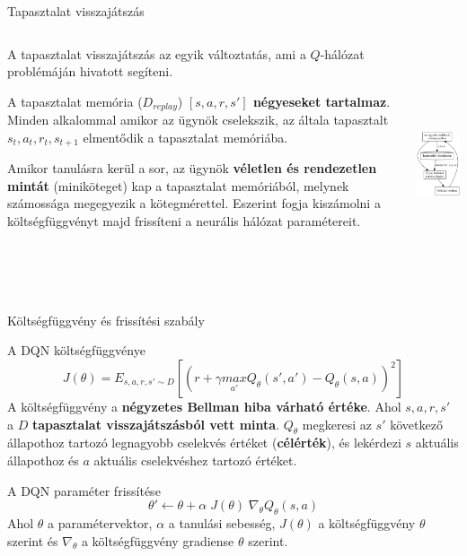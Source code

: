 \documentclass[english, aspectratio=169]{beamer}
\begin{document}
\begin{frame}{Tapasztalat visszajátszás}
\begin{columns}
\begin{column}{.65\textwidth}
A tapasztalat visszajátszás az egyik változtatás, ami a $Q$-hálózat problémáján hivatott segíteni.\par\smallskip
A tapasztalat memória ($D_{replay}$) \textbf{$[s,a,r,s']$ négyeseket tartalmaz}. Minden alkalommal amikor az ügynök cselekszik, az általa tapasztalt $s_t, a_t, r_t, s_{t+1}$ elmentődik a tapasztalat memóriába.\par\smallskip
Amikor tanulásra kerül a sor, az ügynök \textbf{véletlen és rendezetlen mintát} (miniköteget) kap a tapasztalat memóriából, melynek számossága megegyezik a kötegmérettel. Eszerint fogja kiszámolni a költségfüggvényt majd frissíteni a neurális hálózat paramétereit.
\end{column}
\begin{column}{.35\textwidth}
\begin{center}
\includegraphics[height=7cm, keepaspectratio]{graphs/ql_4.png}
\end{center}
\end{column}
\end{columns}
\end{frame}

\begin{frame}{Költségfüggvény és frissítési szabály}
\begin{block}{A DQN költségfüggvénye}
\[
J(\theta) = E_{s,a,r,s' \sim D} \left[ \left( r + \gamma \underset{a'}{max} Q_\theta(s',a') - Q_\theta(s,a) \right)^2 \right]
\]
A költségfüggvény a \textbf{négyzetes Bellman hiba várható értéke}. Ahol $s,a,r,s'$ a $D$ \textbf{tapasztalat visszajátszásból vett minta}. $Q_\theta$ megkeresi az $s'$ következő állapothoz tartozó legnagyobb cselekvés értéket (\textbf{célérték}), és lekérdezi $s$ aktuális állapothoz és $a$ aktuális cselekvéshez tartozó értéket. 
\end{block}
\begin{block}{A DQN paraméter frissítése}
\[
\theta' \leftarrow \theta + \alpha \; J(\theta) \; \nabla_\theta Q_\theta(s,a)
\]
Ahol $\theta$ a paramétervektor, $\alpha$ a tanulási sebesség, $J(\theta)$ a költségfüggvény $\theta$ szerint és $\nabla_\theta$ a költségfüggvény gradiense $\theta$ szerint.
\end{block}
\end{frame}
\end{document}
